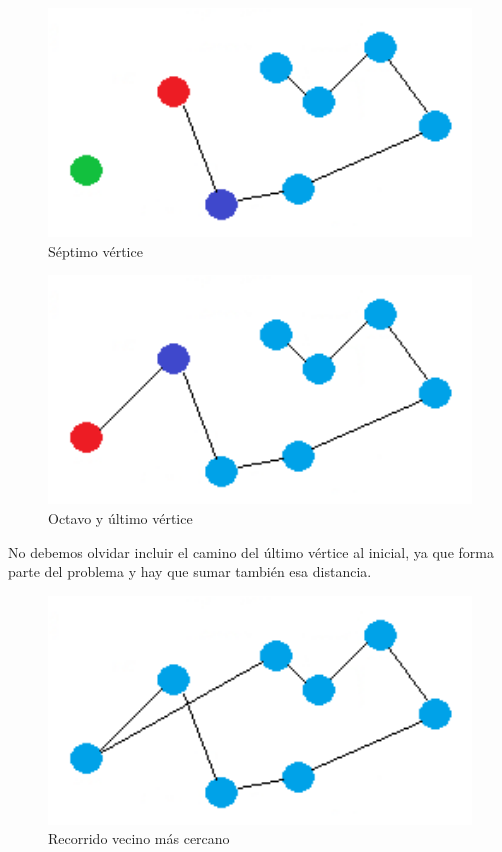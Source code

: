 \vspace{0.5cm}
\begin{figure}[htb] 
	\centering
	\includegraphics[width=1.75\textwidth]{./Imagenes/vecino6.png}
	\caption{Séptimo vértice} 
\end{figure}

\vspace{0.5cm}
\begin{figure}[htb] 
	\centering
	\includegraphics[width=1.75\textwidth]{./Imagenes/vecino7.png}
	\caption{Octavo y último vértice} 
\end{figure}

No debemos olvidar incluir el camino del último vértice al inicial, ya que forma parte del problema y hay que sumar también esa distancia.

\begin{figure}[htb] 
	\centering
	\includegraphics[width=1.75\textwidth]{./Imagenes/vecino8.png}
	\caption{Recorrido vecino más cercano} 
\end{figure}

